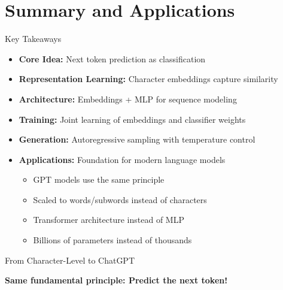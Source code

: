 \documentclass[usenames,dvipsnames]{beamer}
\begin{document}
\section{Summary and Applications}

\begin{frame}{Key Takeaways}
\begin{itemize}[<+->]
\item \textbf{Core Idea:} Next token prediction as classification
\item \textbf{Representation Learning:} Character embeddings capture similarity
\item \textbf{Architecture:} Embeddings + MLP for sequence modeling
\item \textbf{Training:} Joint learning of embeddings and classifier weights
\item \textbf{Generation:} Autoregressive sampling with temperature control
\item \textbf{Applications:} Foundation for modern language models
\begin{itemize}
\item GPT models use the same principle
\item Scaled to words/subwords instead of characters
\item Transformer architecture instead of MLP
\item Billions of parameters instead of thousands
\end{itemize}
\end{itemize}
\end{frame}

\begin{frame}{From Character-Level to ChatGPT}
\begin{center}
\end{center}

\vspace{0.5cm}
\begin{center}
\textbf{Same fundamental principle: Predict the next token!}
\end{center}
\end{frame}
\end{document}
